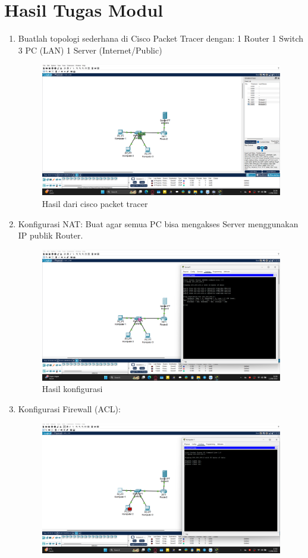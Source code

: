 \section{Hasil Tugas Modul}
\begin{enumerate}
\item Buatlah topologi sederhana di Cisco Packet Tracer dengan:
1 Router
1 Switch
3 PC (LAN)
1 Server (Internet/Public)
    \begin{figure}[H]
        \centering
        \includegraphics[width=0.8\linewidth]{P1/img/24.png}
        \caption{Hasil dari cisco packet tracer}
        \label{fig:gambar4}
    \end{figure}
\item Konfigurasi NAT: Buat agar semua PC bisa mengakses Server menggunakan IP publik Router.
  \begin{figure}[H]
        \centering
        \includegraphics[width=0.8\linewidth]{P1/img/25.png}
        \caption{Hasil konfigurasi}
        \label{fig:gambar4}
    \end{figure}
\item Konfigurasi Firewall (ACL):
\begin{figure}[H]
        \centering
        \includegraphics[width=0.8\linewidth]{P1/img/26.png}

\end{figure}
\end{enumerate}
